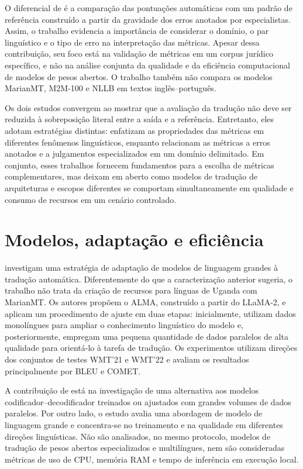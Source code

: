 O diferencial de \cite{di2025meta} é a comparação das pontuações automáticas com um padrão de referência construído a partir da gravidade dos erros anotados por especialistas. Assim, o trabalho evidencia a importância de considerar o domínio, o par linguístico e o tipo de erro na interpretação das métricas. Apesar dessa contribuição, seu foco está na validação de métricas em um corpus jurídico específico, e não na análise conjunta da qualidade e da eficiência computacional de modelos de pesos abertos. O trabalho também não compara os modelos MarianMT, M2M-100 e NLLB em textos inglês--português.

Os dois estudos convergem ao mostrar que a avaliação da tradução não deve ser reduzida à sobreposição literal entre a saída e a referência. Entretanto, eles adotam estratégias distintas: \cite{mukherjee2025detailed} enfatizam as propriedades das métricas em diferentes fenômenos linguísticos, enquanto \cite{di2025meta} relacionam as métricas a erros anotados e a julgamentos especializados em um domínio delimitado. Em conjunto, esses trabalhos fornecem fundamentos para a escolha de métricas complementares, mas deixam em aberto como modelos de tradução de arquiteturas e escopos diferentes se comportam simultaneamente em qualidade e consumo de recursos em um cenário controlado.

\section{Modelos, adaptação e eficiência}

\cite{xu2309paradigm} investigam uma estratégia de adaptação de modelos de linguagem grandes à tradução automática. Diferentemente do que a caracterização anterior sugeria, o trabalho não trata da criação de recursos para línguas de Uganda com MarianMT. Os autores propõem o ALMA, construído a partir do LLaMA-2, e aplicam um procedimento de ajuste em duas etapas: inicialmente, utilizam dados monolíngues para ampliar o conhecimento linguístico do modelo e, posteriormente, empregam uma pequena quantidade de dados paralelos de alta qualidade para orientá-lo à tarefa de tradução. Os experimentos utilizam direções dos conjuntos de testes WMT'21 e WMT'22 e avaliam os resultados principalmente por BLEU e COMET.

A contribuição de \cite{xu2309paradigm} está na investigação de uma alternativa aos modelos codificador--decodificador treinados ou ajustados com grandes volumes de dados paralelos. Por outro lado, o estudo avalia uma abordagem de modelo de linguagem grande e concentra-se no treinamento e na qualidade em diferentes direções linguísticas. Não são analisados, no mesmo protocolo, modelos de tradução de pesos abertos especializados e multilíngues, nem são consideradas métricas de uso de CPU, memória RAM e tempo de inferência em execução local.

